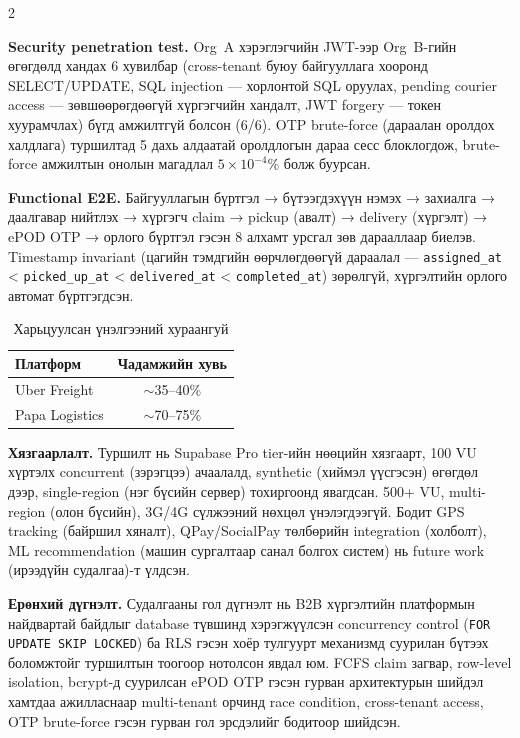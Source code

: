 \begin{multicols*}{2}

\textbf{Security penetration test.} Org~A хэрэглэгчийн JWT-ээр Org~B-гийн өгөгдөлд хандах 6 хувилбар (cross-tenant буюу байгууллага хооронд SELECT/UPDATE, SQL injection --- хорлонтой SQL оруулах, pending courier access --- зөвшөөрөгдөөгүй хүргэгчийн хандалт, JWT forgery --- токен хуурамчлах) бүгд амжилтгүй болсон (6/6). OTP brute-force (дараалан оролдох халдлага) туршилтад 5 дахь алдаатай оролдлогын дараа сесс блоклогдож, brute-force амжилтын онолын магадлал $5 \times 10^{-4}\%$ болж буурсан.

\textbf{Functional E2E.} Байгууллагын бүртгэл → бүтээгдэхүүн нэмэх → захиалга → даалгавар нийтлэх → хүргэгч claim → pickup (авалт) → delivery (хүргэлт) → ePOD OTP → орлого бүртгэл гэсэн 8 алхамт урсгал зөв дарааллаар биелэв. Timestamp invariant (цагийн тэмдгийн өөрчлөгдөөгүй дараалал --- \texttt{assigned\_at} < \texttt{picked\_up\_at} < \texttt{delivered\_at} < \texttt{completed\_at}) зөрөлгүй, хүргэлтийн орлого автомат бүртгэгдсэн.

\begin{table}[H]
\centering
\caption{Харьцуулсан үнэлгээний хураангуй}
\label{tab:tovchlol_comparison}
\scriptsize
\begin{tabular}{|l|c|}
\hline
\textbf{Платформ} & \textbf{Чадамжийн хувь} \\ \hline
Uber Freight & $\sim$35--40\% \\ \hline
Papa Logistics & $\sim$70--75\% \\ \hline
\end{tabular}
\end{table}

\textbf{Хязгаарлалт.} Туршилт нь Supabase Pro tier-ийн нөөцийн хязгаарт, 100 VU хүртэлх concurrent (зэрэгцээ) ачаалалд, synthetic (хиймэл үүсгэсэн) өгөгдөл дээр, single-region (нэг бүсийн сервер) тохиргоонд явагдсан. 500+ VU, multi-region (олон бүсийн), 3G/4G сүлжээний нөхцөл үнэлэгдээгүй. Бодит GPS tracking (байршил хяналт), QPay/SocialPay төлбөрийн integration (холболт), ML recommendation (машин сургалтаар санал болгох систем) нь future work (ирээдүйн судалгаа)-т үлдсэн.

\textbf{Ерөнхий дүгнэлт.} Судалгааны гол дүгнэлт нь B2B хүргэлтийн платформын найдвартай байдлыг database түвшинд хэрэгжүүлсэн concurrency control (\texttt{FOR UPDATE SKIP LOCKED}) ба RLS гэсэн хоёр тулгуурт механизмд суурилан бүтээх боломжтойг туршилтын тоогоор нотолсон явдал юм. FCFS claim загвар, row-level isolation, bcrypt-д суурилсан ePOD OTP гэсэн гурван архитектурын шийдэл хамтдаа ажилласнаар multi-tenant орчинд race condition, cross-tenant access, OTP brute-force гэсэн гурван гол эрсдэлийг бодитоор шийдсэн.


\end{multicols*}

